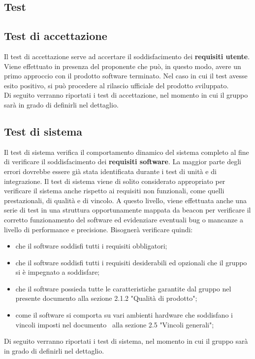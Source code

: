 \documentclass[../PianoDiQualifica.tex]{subfiles}
\begin{document}
\begin{appendices}

\section{Test}
	\subsection{Test di accettazione}
	Il test di accettazione serve ad accertare il soddisfacimento dei \textbf{requisiti utente}. Viene effettuato in presenza del proponente che può, in questo modo, avere un primo approccio con il prodotto software terminato. Nel caso in cui il test avesse esito positivo, si può procedere al rilascio ufficiale del prodotto sviluppato.\\
	Di seguito verranno riportati i test di accettazione, nel momento in cui il gruppo sarà in grado di definirli nel dettaglio.
	\subsection{Test di sistema}
	Il test di sistema verifica il comportamento dinamico del sistema completo al fine di verificare il soddisfacimento dei \textbf{requisiti software}. La maggior parte degli errori dovrebbe essere già stata identificata durante i test di unità e di integrazione. Il test di sistema viene di solito considerato appropriato per verificare il sistema anche rispetto ai requisiti non funzionali, come quelli prestazionali, di qualità e di vincolo. A questo livello, viene effettuata anche una serie di test in una struttura opportunamente mappata da beacon per verificare il corretto funzionamento del software ed evidenziare eventuali bug o mancanze a livello di performance e precisione. Bisognerà verificare quindi:
	\begin{itemize}
		\item che il software soddisfi tutti i requisiti obbligatori;
		\item che il software soddisfi tutti i requisiti desiderabili ed opzionali che il gruppo si è impegnato a soddisfare;
		\item che il software possieda tutte le caratteristiche garantite dal gruppo nel presente documento alla sezione 2.1.2 "Qualità di prodotto";
		\item come il software si comporta su vari ambienti hardware che soddisfano i vincoli imposti nel documento \analisideirequisiti\ alla sezione 2.5 "Vincoli generali";
	\end{itemize}
	Di seguito verranno riportati i test di sistema, nel momento in cui il gruppo sarà in grado di definirli nel dettaglio.
\end{appendices}
\end{document}
